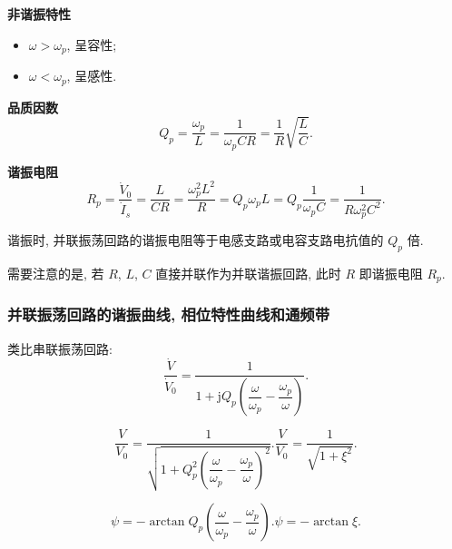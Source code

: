 \textbf{非谐振特性}

\begin{itemize}
    \item $\omega>\omega_p$, 呈容性;
    \item $\omega<\omega_p$, 呈感性.
\end{itemize}

\textbf{品质因数}
\begin{equation}
    Q_p=\frac{\omega_p}{L}=\frac{1}{\omega_pCR}=\frac{1}{R}\sqrt{\frac{L}{C}}.
\end{equation}

\textbf{谐振电阻}
\begin{equation}
    R_p=\frac{\dot{V}_0}{\dot{I}_s}=\frac{L}{CR}=\frac{\omega_p^2L^2}{R}=Q_p\omega_pL=Q_p\frac{1}{\omega_pC}=\frac{1}{R\omega_p^2C^2}.
\end{equation}

谐振时, 并联振荡回路的谐振电阻等于电感支路或电容支路电抗值的 $Q_p$ 倍.

需要注意的是, 若 $R$, $L$, $C$ 直接并联作为并联谐振回路, 此时 $R$ 即谐振电阻 $R_p$.

\subsubsection{并联振荡回路的谐振曲线, 相位特性曲线和通频带}

类比串联振荡回路:
\begin{equation}
    \frac{\dot{V}}{\dot{V}_0}=\frac{1}{1+\mathrm{j}Q_p\left(\dfrac{\omega}{\omega_p}-\dfrac{\omega_p}{\omega}\right)}.
\end{equation}

\begin{subequations}
    \begin{equation}
        \frac{V}{V_0}=\frac{1}{\sqrt{1+Q_p^2\left(\dfrac{\omega}{\omega_p}-\dfrac{\omega_p}{\omega}\right)^2}}.
    \end{equation}
    \begin{equation}
        \frac{V}{V_0}=\frac{1}{\sqrt{1+\xi^2}}.
    \end{equation}
\end{subequations}

\begin{subequations}
    \begin{equation}
        \psi=-\arctan Q_p\left(\frac{\omega}{\omega_p}-\frac{\omega_p}{\omega}\right).
    \end{equation}
    \begin{equation}
        \psi=-\arctan\xi.
    \end{equation}
\end{subequations}


